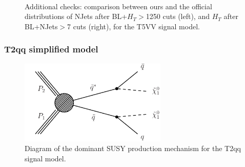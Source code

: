         \begin{figure}
        \centering
        \hspace{-1 cm}
        ~ %
        \caption{Additional checks: comparison between ours and the official distributions of NJets after BL+$H_T$$>$1250 cuts (left), and $H_T$ after BL+NJets$>$7 cuts (right), for the T5VV signal model.}
        \end{figure}   
        

\clearpage
\subsubsection{T2qq simplified model}

\begin{figure}[h!]
\centering
\includegraphics[width=7cm]{figures/Appendices/Ma5ValidationSUS13012/T2qq.pdf}
\caption{Diagram of the dominant SUSY production mechanism
for the T2qq signal model.}
\label{fig:T2qq}
\end{figure}

